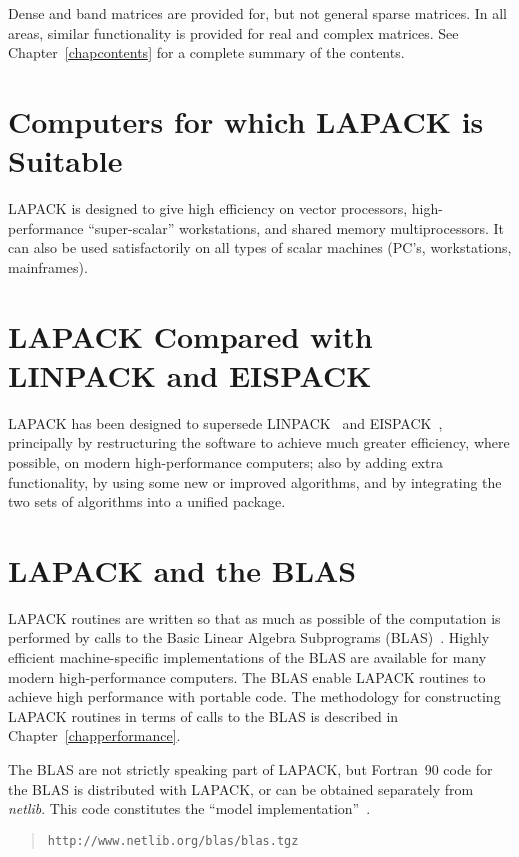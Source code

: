 Dense and band matrices are provided for, but not general sparse matrices. 
In all areas, similar functionality is provided for real and complex matrices.
See Chapter~\ref{chapcontents} for a complete summary of the contents.

\section{Computers for which LAPACK is Suitable}

LAPACK is designed to give high efficiency on vector processors,
high-performance ``super-scalar'' workstations, and shared memory multiprocessors.
It can also be used satisfactorily on all types of scalar machines (PC's, workstations, mainframes).

\section{LAPACK Compared with LINPACK and EISPACK}

LAPACK has been designed to supersede LINPACK~\cite{dongarra79}
and EISPACK~\cite{Smith76,Garbow77}, principally by restructuring the 
software to achieve much greater efficiency, where possible, on modern
high-performance computers; also by adding extra functionality,
by using some new or improved algorithms, and by integrating the two sets
of algorithms into a unified package.

\section{LAPACK and the BLAS}

LAPACK routines are written so that as much as possible of the
computation is performed by calls to the
Basic Linear Algebra Subprograms (BLAS)~\cite{blas1,blas2,blas3}.
Highly efficient machine-specific implementations of the BLAS are
available for many modern high-performance computers. The BLAS
enable LAPACK routines to achieve high performance with portable code.
The methodology for constructing LAPACK routines in terms of calls to the BLAS
is described in Chapter~\ref{chapperformance}. 

The BLAS are not strictly speaking part of LAPACK, but Fortran~90 code
for the BLAS is distributed with LAPACK, or can be obtained separately
from {\em netlib}.  This code constitutes the ``model implementation''~\cite{blas2alg,blas3alg}.
\begin{quote}
{\tt http://www.netlib.org/blas/blas.tgz}
\end{quote}

